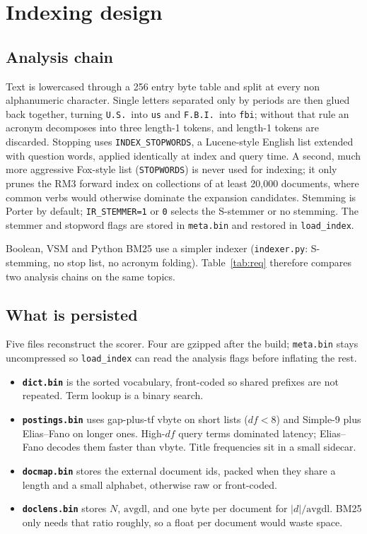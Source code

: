 \documentclass[10pt,a4paper]{article}
\begin{document}
\section{Indexing design}

\subsection{Analysis chain}
Text is lowercased through a 256 entry
byte table and split at every non alphanumeric character. Single letters separated
only by periods are then glued back together, turning \texttt{U.S.}\ into
\texttt{us} and \texttt{F.B.I.}\ into \texttt{fbi}; without that rule an acronym
decomposes into three length-1 tokens, and length-1 tokens are discarded. Stopping uses \texttt{INDEX\_STOPWORDS}, a Lucene-style
English list extended with question words, applied identically at index and query
time. A second, much more aggressive Fox-style list
(\texttt{STOPWORDS}) is never used for indexing; it only prunes the RM3 forward index
on collections of at least 20{,}000 documents, where common verbs would otherwise
dominate the expansion candidates. Stemming is Porter by default; \texttt{IR\_STEMMER=1} or \texttt{0} selects the
S-stemmer or no stemming. The stemmer and stopword flags are stored in
\texttt{meta.bin} and restored in \texttt{load\_index}.

Boolean, VSM and Python BM25 use a simpler indexer (\texttt{indexer.py}: S-stemming,
no stop list, no acronym folding). Table~\ref{tab:req} therefore compares two
analysis chains on the same topics.

\subsection{What is persisted}
Five files reconstruct the scorer. Four are gzipped after the build;
\texttt{meta.bin} stays uncompressed so \texttt{load\_index} can read the analysis
flags before inflating the rest.
\begin{itemize}
  \item \textbf{\texttt{dict.bin}} is the sorted vocabulary, front-coded so shared
        prefixes are not repeated. Term lookup is a binary search.
  \item \textbf{\texttt{postings.bin}} uses gap-plus-tf vbyte on short lists
        ($\mathit{df}{<}8$) and Simple-9 plus Elias--Fano on longer ones. High-$\mathit{df}$
        query terms dominated latency; Elias--Fano decodes them faster than vbyte. Title frequencies sit in a small sidecar.
  \item \textbf{\texttt{docmap.bin}} stores the external document ids, packed when
        they share a length and a small alphabet, otherwise raw or front-coded.
  \item \textbf{\texttt{doclens.bin}} stores $N$, $\mathrm{avgdl}$, and one byte per
        document for $|d|/\mathrm{avgdl}$. BM25 only needs that ratio roughly, so a
        float per document would waste space.
\end{itemize}
\end{document}
